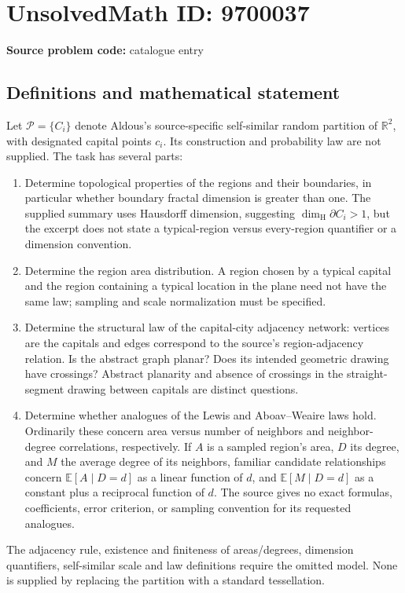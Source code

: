 \documentclass[11pt]{article}
\newcommand{\R}{\mathbb{R}}
\newcommand{\E}{\mathbb{E}}
\begin{document}
\section*{UnsolvedMath ID: 9700037}
\textbf{Source problem code:} catalogue entry
\subsection{Definitions and mathematical statement}
Let \(\mathcal P=\{C_i\}\) denote Aldous's source-specific self-similar random partition of \(\R^2\), with designated capital points \(c_i\). Its construction and probability law are not supplied. The task has several parts:
\begin{enumerate}
\item Determine topological properties of the regions and their boundaries, in particular whether boundary fractal dimension is greater than one. The supplied summary uses Hausdorff dimension, suggesting \(\dim_{\mathrm H}\partial C_i>1\), but the excerpt does not state a typical-region versus every-region quantifier or a dimension convention.
\item Determine the region area distribution. A region chosen by a typical capital and the region containing a typical location in the plane need not have the same law; sampling and scale normalization must be specified.
\item Determine the structural law of the capital-city adjacency network: vertices are the capitals and edges correspond to the source's region-adjacency relation. Is the abstract graph planar? Does its intended geometric drawing have crossings? Abstract planarity and absence of crossings in the straight-segment drawing between capitals are distinct questions.
\item Determine whether analogues of the Lewis and Aboav--Weaire laws hold. Ordinarily these concern area versus number of neighbors and neighbor-degree correlations, respectively. If \(A\) is a sampled region's area, \(D\) its degree, and \(M\) the average degree of its neighbors, familiar candidate relationships concern \(\E[A\mid D=d]\) as a linear function of \(d\), and \(\E[M\mid D=d]\) as a constant plus a reciprocal function of \(d\). The source gives no exact formulas, coefficients, error criterion, or sampling convention for its requested analogues.
\end{enumerate}
The adjacency rule, existence and finiteness of areas/degrees, dimension quantifiers, self-similar scale and law definitions require the omitted model. None is supplied by replacing the partition with a standard tessellation.
\end{document}
